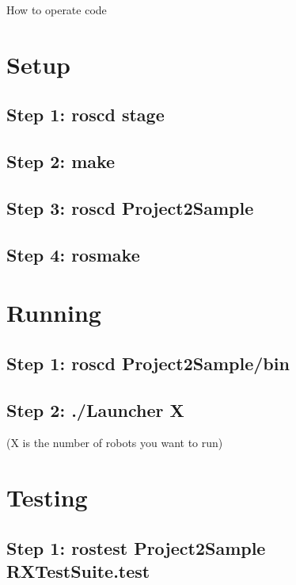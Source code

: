 How to operate code 

\par
\hypertarget{index_setup_sec}{}\section{Setup}\label{index_setup_sec}
\hypertarget{index_step1}{}\subsection{Step 1: roscd stage}\label{index_step1}
\hypertarget{index_step2}{}\subsection{Step 2: make}\label{index_step2}
\hypertarget{index_step3}{}\subsection{Step 3: roscd Project2Sample}\label{index_step3}
\hypertarget{index_step4}{}\subsection{Step 4: rosmake}\label{index_step4}
\par
\hypertarget{index_runnin_sec}{}\section{Running}\label{index_runnin_sec}
\hypertarget{index_step5}{}\subsection{Step 1: roscd Project2Sample/bin}\label{index_step5}
\hypertarget{index_step6}{}\subsection{Step 2: ./Launcher X}\label{index_step6}
(X is the number of robots you want to run) 

\par
\hypertarget{index_testing_sec}{}\section{Testing}\label{index_testing_sec}
\hypertarget{index_step7}{}\subsection{Step 1: rostest Project2Sample RXTestSuite.test}\label{index_step7}
